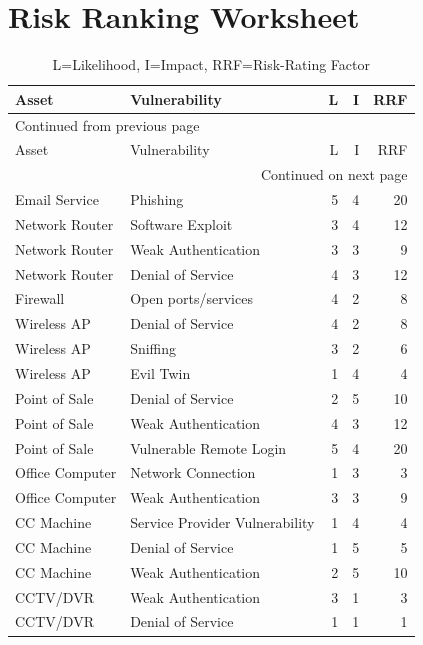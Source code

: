 \documentclass[11pt]{article}
\begin{document}
\section{Risk Ranking Worksheet}
\label{sec:org9bb5cba}
\begin{longtable}{llrrr}
\caption{L=Likelihood, I=Impact, RRF=Risk-Rating Factor}
\\[0pt]
Asset & Vulnerability & L & I & RRF\\[0pt]
\hline
\endfirsthead
\multicolumn{5}{l}{Continued from previous page} \\[0pt]
\hline

Asset & Vulnerability & L & I & RRF \\[0pt]

\hline
\endhead
\hline\multicolumn{5}{r}{Continued on next page} \\
\endfoot
\endlastfoot
\hline
Email Service & Phishing & 5 & 4 & 20\\[0pt]
Network Router & Software Exploit & 3 & 4 & 12\\[0pt]
Network Router & Weak Authentication & 3 & 3 & 9\\[0pt]
Network Router & Denial of Service & 4 & 3 & 12\\[0pt]
Firewall & Open ports/services & 4 & 2 & 8\\[0pt]
Wireless AP & Denial of Service & 4 & 2 & 8\\[0pt]
Wireless AP & Sniffing & 3 & 2 & 6\\[0pt]
Wireless AP & Evil Twin & 1 & 4 & 4\\[0pt]
Point of Sale & Denial of Service & 2 & 5 & 10\\[0pt]
Point of Sale & Weak Authentication & 4 & 3 & 12\\[0pt]
Point of Sale & Vulnerable Remote Login & 5 & 4 & 20\\[0pt]
Office Computer & Network Connection & 1 & 3 & 3\\[0pt]
Office Computer & Weak Authentication & 3 & 3 & 9\\[0pt]
CC Machine & Service Provider Vulnerability & 1 & 4 & 4\\[0pt]
CC Machine & Denial of Service & 1 & 5 & 5\\[0pt]
CC Machine & Weak Authentication & 2 & 5 & 10\\[0pt]
CCTV/DVR & Weak Authentication & 3 & 1 & 3\\[0pt]
CCTV/DVR & Denial of Service & 1 & 1 & 1\\[0pt]
\end{longtable}
\end{document}
